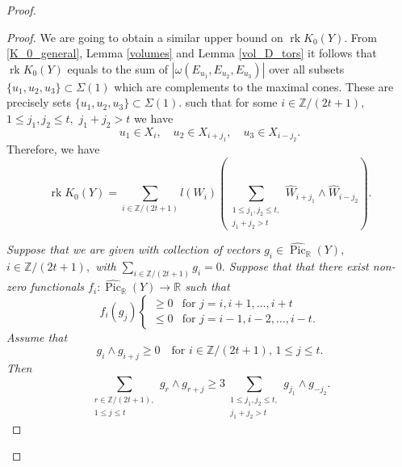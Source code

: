 \documentclass[11pt,leqno]{amsart}
\numberwithin{equation}{section}
\def\R{\mathbb{R}}
\def\Z{\mathbb{Z}}
\newcommand{\Pic}{\operatorname{Pic}}
\newcommand{\rk}{\operatorname{rk}}
\begin{document}
\begin{proof}
\begin{proof}
We are going to obtain a similar upper bound on $\rk K_0(Y).$ From \eqref{K_0_general}, Lemma \ref{volumes} and Lemma \ref{vol_D_tors} it follows that $\rk K_0(Y)$ equals to the sum of
$|\omega(E_{u_1},E_{u_2},E_{u_3})|$ over all subsets $\{u_1,u_2,u_3\}\subset\Sigma(1)$ which are complements to the maximal cones.
These are precisely sets $\{u_1,u_2,u_3\}\subset\Sigma(1).$ such that for some $i\in\Z/(2t+1),$ $1\leq j_1,j_2\leq t,$ $j_1+j_2>t$ we have
$$u_1\in X_i,\quad u_2\in X_{i+j_1},\quad u_3\in X_{i-j_2}.$$
Therefore, we have
\begin{equation}\label{rk_K_0_stack}\rk K_0(Y)=
\sum\limits
_{i\in\Z/(2t+1)}l(W_i)(\sum_{\substack{1\leq j_1,j_2\leq t,\\
j_1+j_2>t}}\widehat{W}_{i+j_1}\wedge\widehat{W}_{i-j_2}). \end{equation}

{} {\it Suppose that we are given with collection of vectors $g_i\in\widehat{\Pic}_{\R}(Y),$
 $i\in\Z/(2t+1),$ with $\sum\limits_{i\in\Z/(2t+1)}g_i=0.$ Suppose that that there exist non-zero functionals $f_i:\widehat{\Pic}_{\R}(Y)\to\R$ such that
$$f_i(g_j)\begin{cases}\geq 0 & \text{for }j=i,i+1,\dots,i+t\\
\leq 0 & \text{for }j=i-1,i-2,\dots,i-t.\end{cases}$$ Assume that
$$g_i\wedge g_{i+j}\geq 0\quad\text{for }i\in\Z/(2t+1),\,1\leq j\leq t.$$ Then
\begin{equation}\sum_{\substack{r\in\Z/(2t+1),\\
1\leq j\leq t}}g_r\wedge g_{r+j}\geq 3\sum_{\substack{1\leq j_1,j_2\leq t,\\
j_1+j_2>t}}g_{j_1}\wedge g_{-j_2}.\end{equation}}


\end{proof}
\end{proof}
\end{document}
